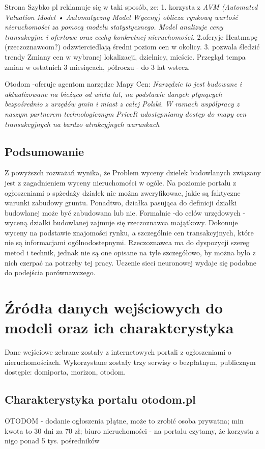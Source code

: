 \documentclass[a4paper,12pt,twoside,openany]{report}
\begin{document}
 Strona Szybko pl reklamuje się w taki sposób, ze:
 1. korzysta z 
\textit {AVM (Automated Valuation Model • Automatyczny Model Wyceny) oblicza rynkową wartość nieruchomości za pomocą modelu statystycznego. Model analizuje ceny transakcyjne i ofertowe oraz cechy konkretnej nieruchomości. }
2.oferyje Heatmapę (rzeczoznawcom?) odzwierciedlają średni poziom cen w okolicy. 
3. pozwala śledzić trendy
Zmiany cen w wybranej lokalizacji, dzielnicy, mieście. Przegląd tempa zmian w ostatnich 3 miesiącach, półroczu - do 3 lat wstecz. 


Otodom -oferuje agentom narzędze Mapy Cen:
\textit{Narzędzie to jest budowane i aktualizowane na bieżąco od wielu lat, na podstawie danych płynących bezpośrednio z urzędów gmin i miast z całej Polski. W ramach współpracy z naszym partnerem technologicznym PriceR udostępniamy dostęp do mapy cen transakcyjnych na bardzo atrakcyjnych warunkach}

\section{Podsumowanie}

Z powyższch rozważań wynika, że 
Problem wyceny dziełek budowlanych związany jest z zagadnieniem wyceny nieruchomości w ogóle. 
Na poziomie portalu z ogłoszeniami o spżedaży działek nie można zweryfikowac, jakie są faktyczne warunki zabudowy gruntu.
Ponadtwo, działka pasująca do definicji działki budowlanej może być zabudowana lub nie.
Formalnie -do celów urzędowych - wyceną działki budowlanej zajmuje się rzeczoznawca majątkowy. Dokonuje wyceny na podstawie znajomości rynku, a szczególnie cen transakcyjnych, które nie są informacjami ogólnodostepnymi. Rzeczoznawca ma do dyspozycji szereg metod i technik, jednak nie są one opisane na tyle szczegółowo, by można było z nich czerpać na potrzeby tej pracy.
Uczenie sieci neuronowej wydaje się podobne do podejścia porównawczego.




\chapter{Źródła danych wejściowych do modeli oraz ich charakterystyka}
 



Dane wejściowe zebrane zostały z internetowych portali z ogłoszeniami o nieruchomościach. Wykorzystane zostały trzy serwisy o bezpłatnym, publicznym dostępie: domiporta, morizon, otodom.

\section{Charakterystyka portalu otodom.pl}
OTODOM - dodanie ogłoszenia płątne, może to zrobić osoba prywatna; min kwota to 30 dni za 70 zł; biuro nieruchomości - na portalu czytamy, że korzysta z nigo ponad 5 tys. pośredników \cite{otodom_o_nas}\\
\end{document}
